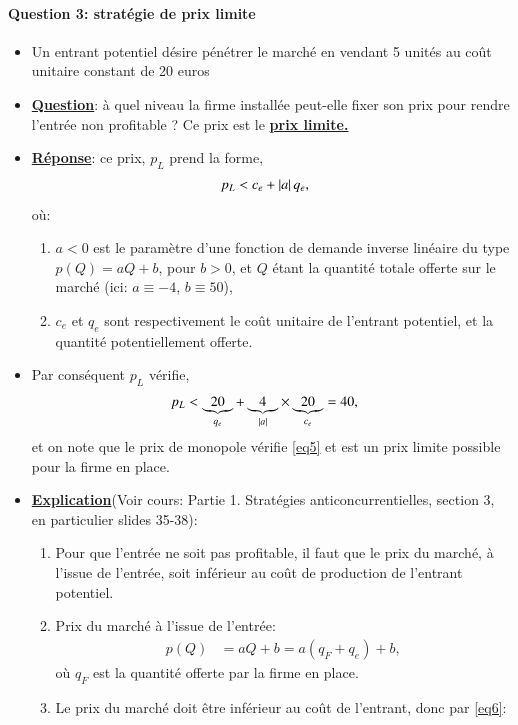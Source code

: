 \begin{frame}
[allowframebreaks]{\insertsection}
\framesubtitle{Question 3: stratégie de prix limite}
\begin{itemize}
\item Un entrant potentiel désire pénétrer le marché en vendant 5 unités au coût unitaire constant de 20 euros
\item \textbf{\underline{Question}}: à quel niveau la firme installée peut-elle fixer son prix
pour rendre l’entrée non profitable ? Ce prix est le \textbf{\underline{prix limite.}}
\item \textbf{\underline{Réponse}}: ce prix, $p_L$ prend la forme,
\begin{align}
p_L &< c_e + \left\vert {a} \right\vert q_e,
\label{eq4}
\end{align}
où:
\begin{enumerate}[$\cdot$]
\item $a<0$ est le paramètre d'une fonction de demande inverse linéaire du type $p(Q) = aQ + b$, pour $b>0$, et $Q$ étant la quantité totale offerte sur le marché
(ici: $a\equiv -4$, $b \equiv 50$),
\item $c_e$ et $q_e$ sont respectivement le coût unitaire de l'entrant potentiel, et la  quantité potentiellement offerte.
\end{enumerate}
\item Par conséquent $p_L$ vérifie,
\begin{align}
p_L &< \underbrace{20}_{q_e}+  \underbrace{4}_{\left\vert {a} \right\vert} \times \underbrace{20}_{c_e} = 40,
\label{eq5}
\end{align}
et on note que le prix de monopole vérifie \eqref{eq5} et est un prix limite possible pour la firme en place.
\item  \textbf{\underline{Explication}}(Voir cours: Partie 1. Stratégies anticoncurrentielles, section 3, en particulier slides 35-38):
\begin{enumerate}[$\cdot$]
\item Pour que l’entrée ne soit pas profitable, il faut que le prix du
marché, à l’issue de l’entrée, soit inférieur au coût de production de
l’entrant potentiel.
\item  Prix du marché à l’issue de l’entrée:
\begin{align}
p(Q) &= aQ + b = a(q_F + q_e ) + b,
\label{eq6}
\end{align}
où $q_F$ est la quantité offerte par la firme en place.
\item Le prix du marché doit être inférieur au coût de l’entrant, donc par \eqref{eq6}:

\end{enumerate}
\end{itemize}
\end{frame}
